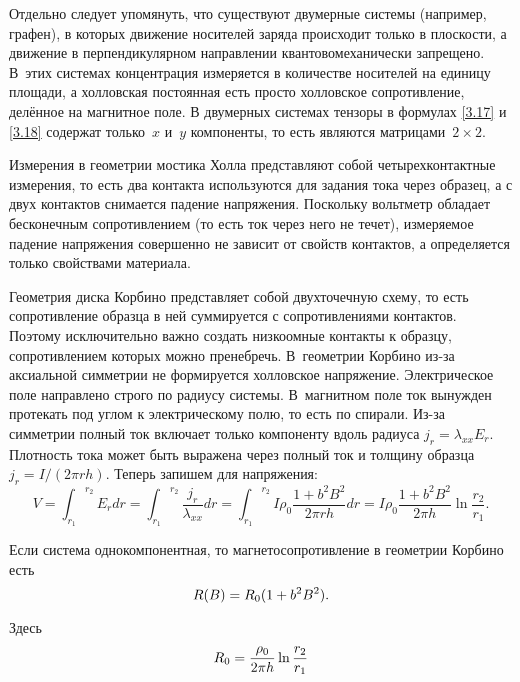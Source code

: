 Отдельно следует упомянуть, что существуют двумерные системы (например, графен),
в которых движение носителей заряда происходит только в плоскости, а движение в
перпендикулярном направлении квантовомеханически запрещено. В~этих системах
концентрация измеряется в количестве носителей на единицу площади, а холловская
постоянная есть просто холловское сопротивление, делённое на магнитное поле. В
двумерных системах тензоры в формулах \eqref{3.17} и \eqref{3.18} содержат
только~$x$ и~$y$ компоненты, то есть являются матрицами~$2\times2$.

Измерения в геометрии мостика Холла представляют собой четырехконтактные
измерения, то есть два контакта используются для задания тока через образец, а с
двух контактов снимается падение напряжения. Поскольку вольтметр обладает
бесконечным сопротивлением (то есть ток через него не течет), измеряемое падение
напряжения совершенно не зависит от свойств контактов, а определяется только
свойствами материала.

Геометрия диска Корбино представляет собой двухточечную схему, то есть
сопротивление образца в ней суммируется с сопротивлениями контактов. Поэтому
исключительно важно создать низкоомные контакты к образцу, сопротивлением
которых можно пренебречь. В~геометрии Корбино из-за аксиальной симметрии не
формируется холловское напряжение. Электрическое поле направлено строго по
радиусу системы. В~магнитном поле ток вынужден протекать под углом к
электрическому полю, то есть по спирали. Из-за симметрии полный ток включает
только компоненту вдоль радиуса $j_r=\lambda_{xx} E_r$. Плотность тока может
быть выражена через полный ток и толщину образца $j_r=I/(2\pi rh)$.
Теперь запишем для напряжения:
\begin{equation*}
V={\int_{r_1}}^{r_2}E_r dr={\int_{r_1}}^{r_2}\frac{j_r}{\lambda_{xx}}
dr={\int_{r_1}}^{r_2}I\rho_0\frac{1+b^2B^2}{2\pi
rh}dr=I\rho_0\frac{1+b^2B^2}{2\pi h}\ln{\frac{r_2}{r_1}}.
\end{equation*}

Если система однокомпонентная, то магнетосопротивление в геометрии Корбино есть
\begin{equation}
	R(B) = R_0(1+b^2B^2)
	\eqmark{MagnetoSoprot}.
\end{equation}

Здесь
\begin{equation}
	R_0 = \frac{\rho_0}{2\pi h} \ln{\frac{r_2}{r_1}}
	\eqmark{KorbinoSoprot}
\end{equation}

